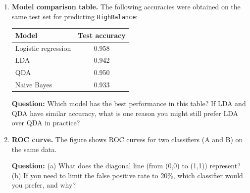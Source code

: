 \documentclass[11pt]{article}
\begin{document}
\begin{enumerate}[leftmargin=*, resume]
\item \textbf{Model comparison table.} The following accuracies were obtained on the same test set for predicting \texttt{HighBalance}:
\begin{center}
\begin{tabular}{lc}
\toprule
Model & Test accuracy \\
\midrule
Logistic regression & 0.958 \\
LDA & 0.942 \\
QDA & 0.950 \\
Naive Bayes & 0.933 \\
\bottomrule
\end{tabular}
\end{center}
\textbf{Question:} Which model has the best performance in this table? If LDA and QDA have similar accuracy, what is one reason you might still prefer LDA over QDA in practice?

\item \textbf{ROC curve.} The figure shows ROC curves for two classifiers (A and B) on the same data.
\begin{center}
\end{center}
\textbf{Question:} (a) What does the diagonal line (from (0,0) to (1,1)) represent? (b) If you need to limit the false positive rate to 20\%, which classifier would you prefer, and why?


\end{enumerate}
\end{document}
